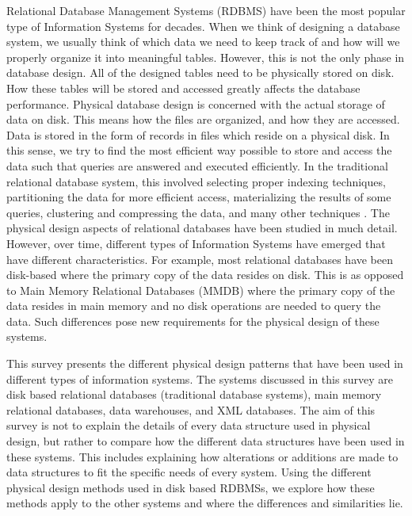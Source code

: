 \documentclass[12pt,a4paper]{article}
\begin{document}
Relational Database Management Systems (RDBMS) have been the most popular type of Information Systems for decades. When we think of designing a database system,
we usually think of which data we need to keep track of and how will we properly organize it into meaningful tables. However, this is not the only phase in
database design. All of the designed tables need to be physically stored on disk. How these tables will be stored and accessed greatly affects the database
performance. Physical database design is concerned with the actual storage of data on disk. This means how the files are organized, and how they are accessed.
Data is stored in the form of records in files which reside on a physical disk. In this sense, we try to find the most efficient way possible to store and
access the data such that queries are answered and executed efficiently. In the traditional relational database system, this involved selecting proper indexing
techniques, partitioning the data for more efficient access, materializing the results of some queries, clustering and compressing the data, and many other
techniques \cite{finkelstein1988physical,lightstone2007physical}. The physical design aspects of relational databases have been studied in much detail. However,
over time, different types of Information Systems have emerged that have different characteristics. For example, most relational databases have been disk-based
where the primary copy of the data resides on disk. This is as opposed to Main Memory Relational Databases (MMDB) where the primary copy of the data resides in
main memory and no disk operations are needed to query the data. Such differences pose new requirements for the physical design of these systems.

This survey presents the different physical design patterns that have been used in different types of information systems. The systems discussed in this survey
are disk based relational databases (traditional database systems), main memory relational databases, data warehouses, and XML databases. The aim of this survey
is not to explain the details of every data structure used in physical design, but rather to compare how the different data structures have been used in these
systems. This includes explaining how alterations or additions are made to data structures to fit the specific needs of every system. Using the different
physical design methods used in disk based RDBMSs, we explore how these methods apply to the other systems and where the differences and similarities lie.
\end{document}
